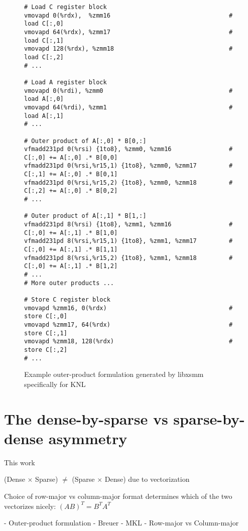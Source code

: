 \begin{figure}[ht]
\begin{verbatim}
# Load C register block
vmovapd 0(%rdx),  %zmm16                                 # load C[:,0]
vmovapd 64(%rdx), %zmm17                                 # load C[:,1]
vmovapd 128(%rdx), %zmm18                                # load C[:,2]
# ...

# Load A register block
vmovapd 0(%rdi), %zmm0                                   # load A[:,0]
vmovapd 64(%rdi), %zmm1                                  # load A[:,1]
# ...

# Outer product of A[:,0] * B[0,:]
vfmadd231pd 0(%rsi) {1to8}, %zmm0, %zmm16                # C[:,0] += A[:,0] .* B[0,0]
vfmadd231pd 0(%rsi,%r15,1) {1to8}, %zmm0, %zmm17         # C[:,1] += A[:,0] .* B[0,1]
vfmadd231pd 0(%rsi,%r15,2) {1to8}, %zmm0, %zmm18         # C[:,2] += A[:,0] .* B[0,2]
# ...

# Outer product of A[:,1] * B[1,:]
vfmadd231pd 8(%rsi) {1to8}, %zmm1, %zmm16                # C[:,0] += A[:,1] .* B[1,0]
vfmadd231pd 8(%rsi,%r15,1) {1to8}, %zmm1, %zmm17         # C[:,0] += A[:,1] .* B[1,1]
vfmadd231pd 8(%rsi,%r15,2) {1to8}, %zmm1, %zmm18         # C[:,0] += A[:,1] .* B[1,2]
# ...
# More outer products ...

# Store C register block
vmovapd %zmm16, 0(%rdx)                                  # store C[:,0]
vmovapd %zmm17, 64(%rdx)                                 # store C[:,1]
vmovapd %zmm18, 128(%rdx)                                # store C[:,2]
# ...
\end{verbatim}
\caption{Example outer-product formulation generated by libxsmm specifically for KNL}
\label{fig:outerproduct}
\end{figure}



\section{The dense-by-sparse vs sparse-by-dense asymmetry}
\label{section:asymmetry}

This work 

(Dense $\times$ Sparse) $\neq$ (Sparse $\times$ Dense) due to vectorization

Choice of row-major vs column-major format determines which of the two vectorizes nicely: $(AB)^T = B^T A^T$

- Outer-product formulation
- Breuer
- MKL
- Row-major vs Column-major



